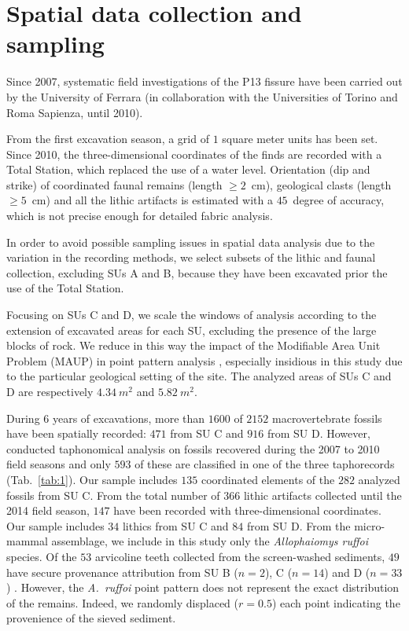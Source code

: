 \documentclass[5p,authoryear]{elsarticle} %
\begin{document}
\section{Spatial data collection and sampling}

Since 2007, systematic field investigations of the P13 fissure have been carried out by the University of Ferrara (in collaboration with the Universities of Torino and Roma Sapienza, until 2010).

From the first excavation season, a grid of $1$ square meter units has been set. Since 2010, the three-dimensional coordinates of the finds are recorded with a Total Station, which replaced the use of a water level. Orientation (dip and strike) of coordinated faunal remains (length $\geq2$~cm), geological clasts (length $\geq5$~cm) and all the lithic artifacts is estimated with a $45$~degree of accuracy, which is not precise enough for detailed fabric analysis.

In order to avoid possible sampling issues in spatial data analysis due to the variation in the recording methods, we select subsets of the lithic and faunal collection, excluding SUs A and B, because they have been excavated prior the use of the Total Station.

Focusing on SUs C and D, we scale the windows of analysis according to the extension of excavated areas for each SU, excluding the presence of the large blocks of rock. We reduce in this way the impact of the Modifiable Area Unit Problem (MAUP) in point pattern analysis \citep{Openshaw1996}, especially insidious in this study due to the particular geological setting of the site. The analyzed areas of SUs C and D are respectively $4.34~m^{2}$ and $5.82~m^{2}$.

During 6 years of excavations, more than $1600$ of $2152$ macrovertebrate fossils have been spatially recorded: $471$ from SU C and $916$ from SU D. However, \citet{Bagnus2011} conducted taphonomical analysis on fossils recovered during the 2007 to 2010 field seasons and only $593$ of these are classified in one of the three taphorecords (Tab.~\ref{tab:1}). Our sample includes $135$ coordinated elements of the $282$ analyzed fossils from SU C. From the total number of $366$ lithic artifacts collected until the 2014 field season, $147$ have been recorded with three-dimensional coordinates. Our sample includes $34$ lithics from SU C and $84$ from SU D. From the micro-mammal assemblage, we include in this study only the \emph{Allophaiomys ruffoi} species. Of the $53$ arvicoline teeth collected from the screen-washed sediments, $49$ have secure provenance attribution from SU B ($n=2$), C ($n=14$) and D ($n=33$) \citep{Lopez-Garcia2015}. However, the \emph{A.~ruffoi} point pattern does not represent the exact distribution of the remains. Indeed, we randomly displaced ($r=0.5$) each point indicating the provenience of the sieved sediment.
\end{document}
